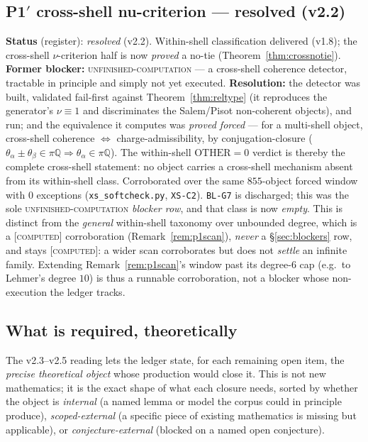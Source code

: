 \documentclass[11pt]{article}
\newcommand{\tagC}{\textcolor{cC}{\textsc{[computed]}}}
\newcommand{\hx}[1]{\textcolor{cC}{\footnotesize\texttt{#1}}}
\newcommand{\Q}{\mathbb{Q}}
\theoremstyle{plain}
\theoremstyle{definition}
\theoremstyle{remark}
\begin{document}
\subsection{P1\texorpdfstring{$'$}{'} cross-shell nu-criterion --- resolved (v2.2)}\label{blk:p1cross}
\textbf{Status} (register): \emph{resolved} (v2.2). Within-shell classification
delivered (v1.8); the cross-shell $\nu$-criterion half is now \emph{proved} a
no-tie (Theorem~\ref{thm:crossnotie}). \textbf{Former blocker:}
\textsc{unfinished-computation} --- a cross-shell coherence detector, tractable in
principle and simply not yet executed. \textbf{Resolution:} the detector was
built, validated fail-first against Theorem~\ref{thm:reltype} (it reproduces the
generator's $\nu\equiv1$ and discriminates the Salem/Pisot non-coherent objects),
and run; and the equivalence it computes was \emph{proved forced} --- for a
multi-shell object, cross-shell coherence $\iff$ charge-admissibility, by
conjugation-closure ($\theta_\alpha\pm\theta_\beta\in\pi\Q\Rightarrow
\theta_\alpha\in\pi\Q$). The within-shell $\mathrm{OTHER}=0$ verdict is thereby
the complete cross-shell statement: no object carries a cross-shell mechanism
absent from its within-shell class. Corroborated over the same $855$-object
forced window with $0$ exceptions (\texttt{xs\_softcheck.py}, \hx{XS-C2}).
\hx{BL-G7} is discharged; this was the sole \textsc{unfinished-computation}
\emph{blocker row}, and that class is now \emph{empty}. This is distinct from the
\emph{general} within-shell taxonomy over unbounded degree, which is a \tagC{}
corroboration (Remark~\ref{rem:p1scan}), \emph{never} a \S\ref{sec:blockers} row,
and stays \tagC{}: a wider scan corroborates but does not \emph{settle} an
infinite family. Extending Remark~\ref{rem:p1scan}'s window past its
degree-$6$ cap (e.g.\ to Lehmer's degree $10$) is thus a runnable corroboration,
not a blocker whose non-execution the ledger tracks.

\subsection{What is required, theoretically}\label{blk:required}
The v2.3--v2.5 reading lets the ledger state, for each remaining open item, the
\emph{precise theoretical object} whose production would close it. This is not new
mathematics; it is the exact shape of what each closure needs, sorted by whether
the object is \emph{internal} (a named lemma or model the corpus could in principle
produce), \emph{scoped-external} (a specific piece of existing mathematics is
missing but applicable), or \emph{conjecture-external} (blocked on a named open
conjecture).
\end{document}
